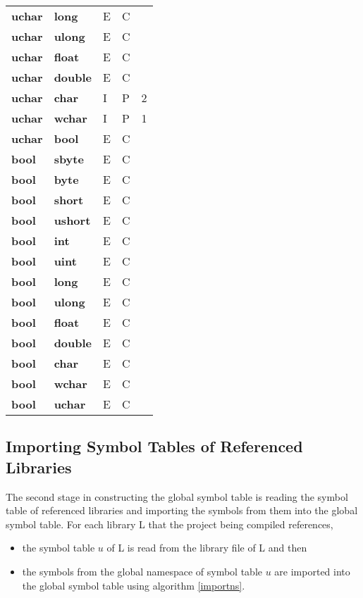 \documentclass[a4paper,oneside,11pt]{book}
\theoremstyle{definition}
\begin{document}
\begin{flushleft}
\begin{supertabular}{lllll}
\textbf{uchar}& \textbf{long}& E& C&\\
\textbf{uchar}& \textbf{ulong}& E& C&\\
\textbf{uchar}& \textbf{float}& E& C&\\
\textbf{uchar}& \textbf{double}& E& C&\\
\textbf{uchar}& \textbf{char}& I& P&2\\
\textbf{uchar}& \textbf{wchar}& I& P&1\\
\textbf{uchar}& \textbf{bool}& E& C&\\
\hline
\textbf{bool}& \textbf{sbyte}& E& C&\\
\textbf{bool}& \textbf{byte}& E& C&\\
\textbf{bool}& \textbf{short}& E& C&\\
\textbf{bool}& \textbf{ushort}& E& C&\\
\textbf{bool}& \textbf{int}& E& C&\\
\textbf{bool}& \textbf{uint}& E& C&\\
\textbf{bool}& \textbf{long}& E& C&\\
\textbf{bool}& \textbf{ulong}& E& C&\\
\textbf{bool}& \textbf{float}& E& C&\\
\textbf{bool}& \textbf{double}& E& C&\\
\textbf{bool}& \textbf{char}& E& C&\\
\textbf{bool}& \textbf{wchar}& E& C&\\
\textbf{bool}& \textbf{uchar}& E& C&\\
\hline
\end{supertabular}
\end{flushleft}

\subsection{Importing Symbol Tables of Referenced Libraries}

The second stage in constructing the global symbol table is
reading the symbol table of referenced libraries and importing the symbols from them into the global symbol table.
For each library L that the project being compiled references,

\begin{itemize}
\item
the symbol table $u$ of L is read from the library file of L and then
\item
the symbols from the global namespace of symbol table $u$ are imported into the global symbol table using algorithm \ref{importns}.
\end{itemize}
\end{document}

